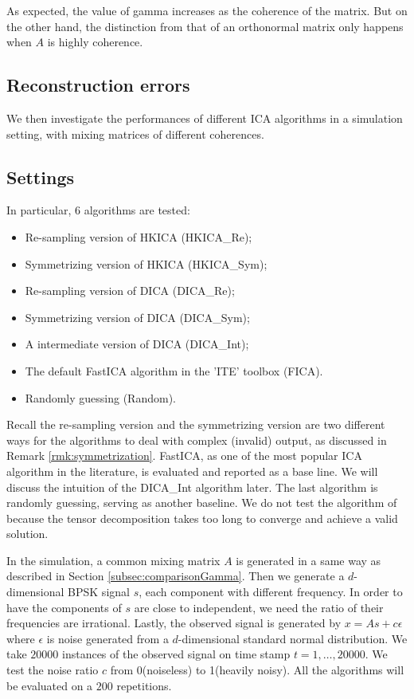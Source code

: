 \documentclass[twoside]{article}
\theoremstyle{definition}
\begin{document}
As expected, the value of gamma increases as the coherence of the matrix. 
But on the other hand, the distinction from that of an orthonormal matrix only happens when $A$ is highly coherence. 

\subsection{Reconstruction errors}
We then investigate the performances of different ICA algorithms in a simulation setting, with mixing matrices of different coherences. 

\subsection{Settings}
In particular, 6 algorithms are tested: 
\begin{itemize}
\vspace{-3mm}
\item Re-sampling version of  HKICA (HKICA\_Re);
\item Symmetrizing version of  HKICA  (HKICA\_Sym);
\item Re-sampling version of DICA  (DICA\_Re);
\item Symmetrizing version of  DICA  (DICA\_Sym);
\item A intermediate version of  DICA  (DICA\_Int);
\item The default FastICA algorithm in the 'ITE' toolbox \citep{szabo12separation} (FICA). 
\item  Randomly guessing (Random).
\end{itemize}
\vspace{-3mm}
Recall the re-sampling version and the symmetrizing version are two different ways for the algorithms to deal with complex (invalid) output, as discussed in Remark \ref{rmk:symmetrization}.
FastICA, as one of the most popular ICA algorithm in the literature, is evaluated and reported as a base line. 
We will discuss the intuition of the DICA\_Int algorithm later. 
The last algorithm is randomly guessing, serving as another baseline.
We do not test the algorithm of \citep{anandkumar2012tensordecomposition} because the tensor decomposition takes too long to converge and achieve a valid solution. 

In the simulation, a common mixing matrix $A$ is generated in a same way as described in Section \ref{subsec:comparisonGamma}. 
Then we generate a $d$-dimensional BPSK signal $s$, each component with different frequency. 
In order to have the components of $s$ are close to independent, we need the ratio of their frequencies are irrational. 
Lastly, the observed signal is generated by $x = As+c\epsilon$ where $\epsilon$ is noise generated from a $d$-dimensional standard normal distribution. 
We take $20000$ instances of the observed signal on time stamp $t= 1,\ldots, 20000$.
We test the noise ratio $c$ from 0(noiseless) to 1(heavily noisy). 
All the algorithms will be evaluated on a $200$ repetitions.
\end{document}
